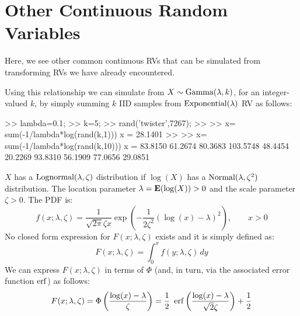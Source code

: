 \section{Other Continuous Random Variables}\label{S:OtherContRVs}
Here, we see other common continuous RVs that can be simulated from transforming RVs we have already encountered.
\begin{simulation}\label{SIM:Gamma}
Using this relationship we can simulate from $X \sim \mbox{{\rm Gamma}}(\lambda,k)$, for an integer-valued $k$, by simply summing $k$ IID samples from $\mbox{{\rm Exponential}}(\lambda)$ RV as follows:
\begin{VrbM}
>> lambda=0.1; %
>> k=5; %
>> rand('twister',7267); %
>> %
>> x= sum(-1/lambda*log(rand(k,1)))
x =   28.1401
>> %
>> x= sum(-1/lambda*log(rand(k,10)))
x =
   83.8150   61.2674   80.3683  103.5748   48.4454   20.2269   93.8310   56.1909   77.0656   29.0851
\end{VrbM}
\end{simulation}

\begin{model}[$\lognormal(\lambda,\zeta)$]
$X$ has a $\lognormal(\lambda,\zeta) $ distribution if $\log(X)$ has a $\mbox{{\rm Normal}}(\lambda,\zeta^2)$ distribution.  The location parameter $\lambda = \mathbf{E}(\log(X)) > 0$ and the scale parameter $\zeta > 0$.  The PDF is:
\begin{equation}\label{E:LogNormalpdf}
f(x; \lambda, \zeta) = \frac{1}{\sqrt{2 \pi} \zeta x }
 \exp{\left( - \frac{1}{2 \zeta^2} (\log(x)-\lambda)^2 \right)}, \qquad x > 0
\end{equation}
No closed form expression for $F(x;\lambda,\zeta)$ exists and it is simply defined as:
\[
F(x;\lambda,\zeta) = \int_{0}^x f (y;\lambda,\zeta)\,dy
\]
We can express $F(x;\lambda,\zeta) $ in terms of $\Phi$ (and, in turn, via the associated  error function $\operatorname{erf}$) as follows:
\begin{equation}\label{E:DFLogNormalviaErf}
F(x;\lambda,\zeta) = \Phi \left( \frac{\log(x) - \lambda}{\zeta} \right) = \frac{1}{2} \ \operatorname{erf} \left(  \frac{\log(x)-\lambda}{\sqrt{2}\zeta} \right)+ \frac{1}{2}
\end{equation}
\end{model}

